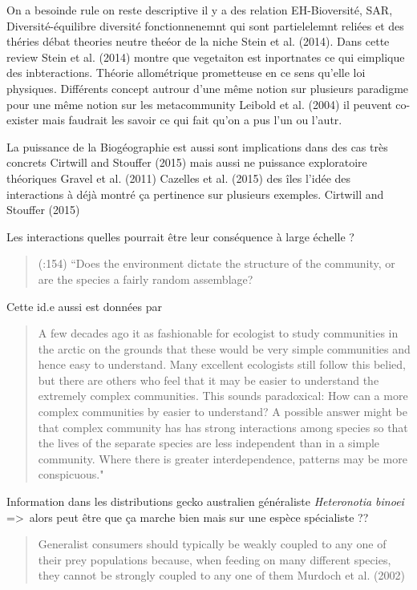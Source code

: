 On a besoinde rule on reste descriptive il y a des relation
EH-Bioversité, SAR, Diversité-équilibre diversité fonctionnenemnt qui
sont partielelemnt reliées et des théries débat theories neutre theéor
de la niche Stein et al. (2014). Dans cette review Stein et al. (2014)
montre que vegetaiton est inportnates ce qui eimplique des
inbteractions. Théorie allométrique prometteuse en ce sens qu'elle loi
physiques. Différents concept autrour d'une même notion sur plusieurs
paradigme pour une même notion sur les metacommunity Leibold et al.
(2004) il peuvent co-exister mais faudrait les savoir ce qui fait qu'on
a pus l'un ou l'autr.

La puissance de la Biogéographie est aussi sont implications dans des
cas très concrets Cirtwill and Stouffer (2015) mais aussi ne puissance
exploratoire théoriques Gravel et al. (2011) Cazelles et al. (2015) des
îles l'idée des interactions à déjà montré ça pertinence sur plusieurs
exemples. Cirtwill and Stouffer (2015)

Les interactions quelles pourrait être leur conséquence à large échelle
?

\begin{quote}
(:154) ``Does the environment dictate the structure of the community, or
are the species a fairly random assemblage?
\end{quote}

Cette id.e aussi est données par

\begin{quote}
A few decades ago it as fashionable for ecologist to study communities
in the arctic on the grounds that these would be very simple communities
and hence easy to understand. Many excellent ecologists still follow
this belied, but there are others who feel that it may be easier to
understand the extremely complex communities. This sounds paradoxical:
How can a more complex communities by easier to understand? A possible
answer might be that complex community has has strong interactions among
species so that the lives of the separate species are less independent
than in a simple community. Where there is greater interdependence,
patterns may be more conspicuous."
\end{quote}

Information dans les distributions gecko australien généraliste
\emph{Heteronotia binoei} =\textgreater{}~alors peut être que ça marche
bien mais sur une espèce spécialiste ??

\begin{quote}
Generalist consumers should typically be weakly coupled to any one of
their prey populations because, when feeding on many different species,
they cannot be strongly coupled to any one of them Murdoch et al. (2002)
\end{quote}

